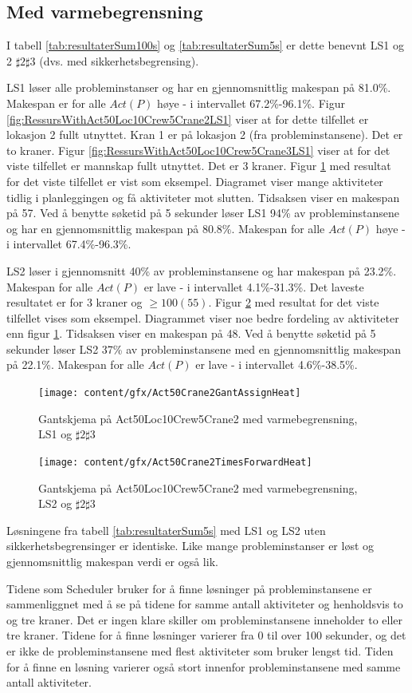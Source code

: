 \subsection{Med varmebegrensning}
I tabell \ref{tab:resultaterSum100s} og \ref{tab:resultaterSum5s} er dette benevnt LS1 og 2 $\sharp 2\sharp 3$ (dvs. med sikkerhetsbegrensing).

LS1 løser alle probleminstanser og har en gjennomsnittlig makespan på 81.0\%. Makespan er for alle $Act(P)$ høye - i intervallet 67.2\%-96.1\%. Figur \ref{fig:RessursWithAct50Loc10Crew5Crane2LS1} viser at for dette tilfellet er lokasjon 2 fullt utnyttet. Kran 1 er på lokasjon 2 (fra probleminstansene). Det er to kraner. Figur \ref{fig:RessursWithAct50Loc10Crew5Crane3LS1} viser at for det viste tilfellet er mannskap fullt utnyttet. Det er 3 kraner. Figur \ref{fig:GantWithAct50Loc10Crew5Crane2AssignHeat} med resultat for det viste tilfellet er vist som eksempel. Diagramet viser mange aktiviteter tidlig i planleggingen og få aktiviteter mot slutten. Tidsaksen viser en makespan på 57. Ved å benytte søketid på 5 sekunder løser LS1 94\% av probleminstansene og har en gjennomsnittlig makespan på 80.8\%. Makespan for alle $Act(P)$ høye - i intervallet 67.4\%-96.3\%.

LS2 løser i gjennomsnitt 40\% av probleminstansene og har makespan på 23.2\%. Makespan for alle $Act(P)$ er lave - i intervallet 4.1\%-31.3\%. Det laveste resultatet er for 3 kraner og $\ge 100(55)$. Figur \ref{fig:GantWithAct50Loc10Crew5Crane2TFHeat} med resultat for det viste tilfellet vises som eksempel. Diagrammet viser noe bedre fordeling av aktiviteter enn figur \ref{fig:GantWithAct50Loc10Crew5Crane2AssignHeat}. Tidsaksen viser en makespan på 48. Ved å benytte søketid på 5 sekunder løser LS2 37\% av probleminstansene med en gjennomsnittlig makespan på 22.1\%. Makespan for alle $Act(P)$ er lave - i intervallet 4.6\%-38.5\%.
\begin{figure}[!h]
\centering
\texttt{[image: content/gfx/Act50Crane2GantAssignHeat]}
\caption{Gantskjema på Act50Loc10Crew5Crane2 med varmebegrensning, LS1 og $\sharp2\sharp3$}
\label{fig:GantWithAct50Loc10Crew5Crane2AssignHeat}
\end{figure}
\begin{figure}[!h]
\centering
\texttt{[image: content/gfx/Act50Crane2TimesForwardHeat]}
\caption{Gantskjema på Act50Loc10Crew5Crane2 med varmebegrensning, LS2 og $\sharp2\sharp3$}
\label{fig:GantWithAct50Loc10Crew5Crane2TFHeat}
\end{figure}

Løsningene fra tabell \ref{tab:resultaterSum5s} med LS1 og LS2 uten sikkerhetsbegrensinger er identiske. Like mange probleminstanser er løst og gjennomsnittlig makespan verdi er også lik.

Tidene som Scheduler bruker for å finne løsninger på probleminstansene er sammenliggnet med å se på tidene for samme antall aktiviteter og henholdsvis to og tre kraner. Det er ingen klare skiller om probleminstansene inneholder to eller tre kraner. Tidene for å finne løsninger varierer fra 0 til over 100 sekunder, og det er ikke de probleminstansene med flest aktiviteter som bruker lengst tid. Tiden for å finne en løsning varierer også stort innenfor probleminstansene med samme antall aktiviteter.
